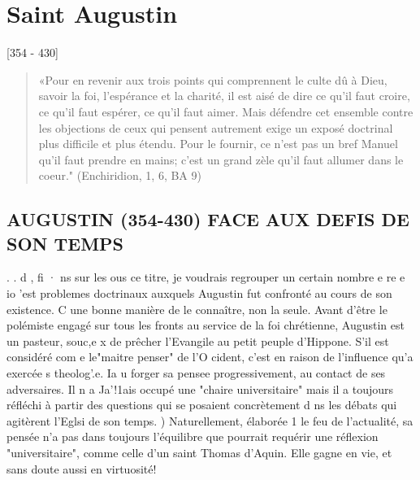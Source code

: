 \chapter{Saint Augustin}


 
[354 - 430]






 
\begin{quote}
    «Pour en revenir aux trois points qui comprennent le culte dû à Dieu, savoir la foi, l'espérance et la charité, il est aisé de dire ce qu'il faut croire, ce
qu'il faut espérer, ce qu'il faut aimer. Mais défendre cet ensemble contre les objections de ceux qui pensent autrement exige un exposé doctrinal plus difficile et plus étendu. Pour le fournir, ce n'est pas un bref Manuel qu'il faut prendre en mains; c'est
un grand zèle qu'il faut allumer dans le coeur." (Enchiridion, 1, 6, BA 9)
\end{quote}









 


\section{AUGUSTIN	(354-430)  FACE AUX DEFIS DE SON TEMPS}

.	.	d	,	fi	· ns sur les
ous ce titre, je voudrais regrouper un certain nombre e	re e io	'est
problemes doctrinaux auxquels Augustin fut confronté au cours de son existence. C
une bonne manière de le connaître, non la seule. Avant d'être le polémiste engagé sur tous les fronts au service de la foi chrétienne, Augustin est un pasteur, souc,e x de prêcher l'Evangile au petit peuple d'Hippone.	S'il est considéré com e le"maitre penser" de l'O cident, c'est en raison de l'influence qu'a exercée s theolog'.e. Ia	u
forger sa pensee progressivement, au contact de ses adversaires. Il n a Ja'!1ais occupé une "chaire universitaire" mais il a toujours réfléchi à partir des questions
qui se posaient concrètement  d ns les débats qui agitèrent l'Eglsi de son temps.
)	Naturellement,	élaborée	1	le feu de l'actualité, sa pensée n'a pas	 
dans	toujours
l'équilibre que pourrait	requérir une réflexion "universitaire", comme celle d'un saint Thomas d'Aquin. Elle gagne en vie, et sans doute aussi en virtuosité!

